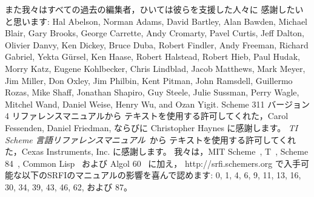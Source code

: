また我々はすべての過去の編集者，ひいては彼らを支援した人々に
感謝したいと思います: Hal Abelson, Norman Adams, David
Bartley, Alan Bawden, Michael Blair, Gary Brooks, George Carrette,
Andy Cromarty, Pavel Curtis, Jeff Dalton, Olivier Danvy, Ken Dickey,
Bruce Duba, Robert Findler, Andy Freeman, Richard Gabriel, Yekta
G\"ursel, Ken Haase, Robert Halstead, Robert Hieb, Paul Hudak, Morry
Katz, Eugene Kohlbecker, Chris Lindblad, Jacob Matthews, Mark Meyer,
Jim Miller, Don Oxley, Jim Philbin, Kent Pitman, John Ramsdell,
Guillermo Rozas, Mike Shaff, Jonathan Shapiro, Guy Steele, Julie
Sussman, Perry Wagle, Mitchel Wand, Daniel Weise, Henry Wu, and Ozan
Yigit.
Scheme 311 バージョン 4 リファレンスマニュアルから
テキストを使用する許可してくれた，Carol Fessenden, Daniel Friedman,
ならびに Christopher Haynes に感謝します。
{\em TI Scheme 言語リファレンスマニュアル}~\cite{TImanual85}から
テキストを使用する許可してくれた，Cexas Instruments, Inc. に感謝します。
我々は，MIT Scheme~\cite{MITScheme}, T~\cite{Rees84}, Scheme 84~\cite{Scheme84},
Common Lisp~\cite{CLtL} および Algol 60~\cite{Naur63} に加え，
{\cf http://srfi.schemers.org} で入手可能な以下のSRFIのマニュアルの影響を喜んで認めます:
0, 1, 4, 6, 9, 11, 13, 16, 30, 34, 39, 43, 46, 62, および 87。


